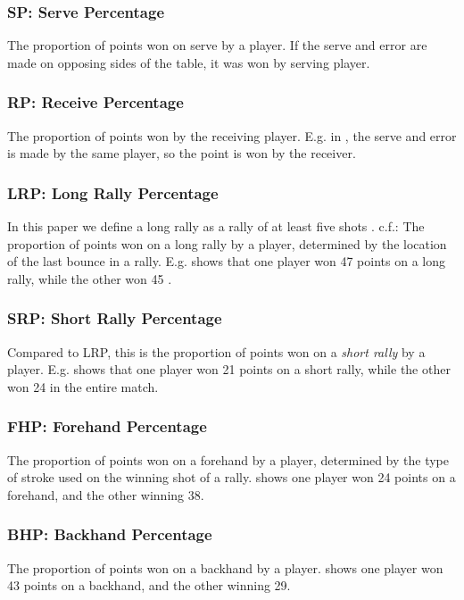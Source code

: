 \subsubsection*{SP: Serve Percentage}\label{sec:sp}
The proportion of points won on serve by a player. 
If the serve and error are made on opposing sides of the table, it  was won by serving player.

\subsubsection*{RP: Receive Percentage}\label{sec:rp}
The proportion of points won by the receiving player. E.g. in ,  the serve and error is made by the same player, so the point is won by the receiver.

\subsubsection*{LRP: Long Rally Percentage}\label{sec:lrp}
In this paper we define a long rally  as a rally of at least five shots . c.f.: 
The proportion of points won on a long rally by a player, determined by the location of the last bounce in a rally. E.g.  shows that one player won 47 points on a long rally, while the other won 45 .

\subsubsection*{SRP: Short Rally Percentage}\label{sec:srp}
Compared to LRP, this is the proportion of points won on a \textit{short rally} by a player. E.g.  shows that one player won 21 points on a short rally, while the other won 24 in the entire match.

\subsubsection*{FHP: Forehand Percentage}\label{sec:fp}
The proportion of points won on a forehand by a player, determined by the type of stroke used on the winning shot of a rally.  shows one player won 24 points on a forehand, and the other winning 38.

\subsubsection*{BHP: Backhand Percentage}\label{sec:bp}
The proportion of points won on a backhand by a player.  shows one player won 43 points on a backhand, and the other winning 29.

